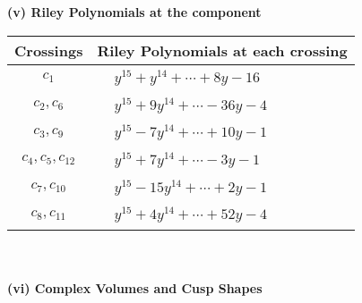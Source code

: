\documentclass[1p]{elsarticle_modified}
\theoremstyle{definition}
\begin{document}
\newpage\renewcommand{\arraystretch}{1}
\flushleft \textbf{(v) Riley Polynomials at the component}\newline \\
\begin{tabular}{m{50pt}|m{274pt}}
Crossings & \hspace{64pt}Riley Polynomials at each crossing \\
\hline $$\begin{aligned}c_{1}\end{aligned}$$&$\begin{aligned}
&y^{15}+y^{14}+\cdots+8 y-16
\end{aligned}$\\
\hline $$\begin{aligned}c_{2},c_{6}\end{aligned}$$&$\begin{aligned}
&y^{15}+9 y^{14}+\cdots-36 y-4
\end{aligned}$\\
\hline $$\begin{aligned}c_{3},c_{9}\end{aligned}$$&$\begin{aligned}
&y^{15}-7 y^{14}+\cdots+10 y-1
\end{aligned}$\\
\hline $$\begin{aligned}c_{4},c_{5},c_{12}\end{aligned}$$&$\begin{aligned}
&y^{15}+7 y^{14}+\cdots-3 y-1
\end{aligned}$\\
\hline $$\begin{aligned}c_{7},c_{10}\end{aligned}$$&$\begin{aligned}
&y^{15}-15 y^{14}+\cdots+2 y-1
\end{aligned}$\\
\hline $$\begin{aligned}c_{8},c_{11}\end{aligned}$$&$\begin{aligned}
&y^{15}+4 y^{14}+\cdots+52 y-4
\end{aligned}$\\
\hline
\end{tabular}\\~\\
\newpage\flushleft \textbf{(vi) Complex Volumes and Cusp Shapes}
\end{document}
